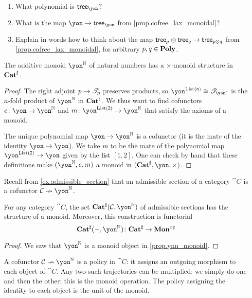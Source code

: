 \documentclass[Book-Poly]{subfiles}
\begin{document}
\begin{exercise}
\begin{enumerate}
	\item What polynomial is $\tr_\yon$?
	\item What is the map $\yon\to\tr_\yon$ from \cref{prop.cofree_lax_monoidal}?
	\item Explain in words how to think about the map $\mathsf{tree}_p\otimes\mathsf{tree}_q\to\mathsf{tree}_{p\otimes q}$ from \cref{prop.cofree_lax_monoidal}, for arbitrary $p,q\in\mathbf{Poly}$.
\qedhere
\end{enumerate}
\end{exercise}

\begin{proposition}\label{prop.ynn_monoid}
The additive monoid $\yon^\nn$ of natural numbers has a $\times$-monoid structure in $\mathbf{Cat}^\sharp$.
\end{proposition}
\begin{proof}
The right adjoint $p\mapsto\mathscr{T}_{p}$ preserves products, so $\yon^{\List(\ord{n})}\cong\cofree{\yon^{\ord{n}}}$ is the $n$-fold product of $\yon^\nn$ in $\mathbf{Cat}^\sharp$. We thus want to find cofunctors $e\colon \yon\to\yon^\nn$ and $m\colon\yon^{\List(\2)}\to\yon^\nn$ that satisfy the axioms of a monoid. 

The unique polynomial map $\yon\to\yon^\nn$ is a cofunctor (it is the mate of the identity $\yon\to\yon$). We take $m$ to be the mate of the polynomial map $\yon^{\List(\2)}\to\yon$ given by the list $[1,2]$. One can check by hand that these definitions make $(\yon^\nn,e,m)$ a monoid in $(\smcat^\sharp,\yon,\times)$.
\end{proof}

Recall from \cref{ex.admissible_section} that an admissible section of a category $\cat{C}$ is a cofunctor $\cat{C}\cof\yon^\nn$.

\begin{corollary}
For any category $\cat{C}$, the set $\smcat^\sharp(\cat{C},\yon^\nn)$ of admissible sections has the structure of a monoid. Moreover, this construction is functorial
\[\smcat^\sharp(-,\yon^\nn)\colon\smcat^\sharp\to\Cat{Mon}\op\]
\end{corollary}
\begin{proof}
We saw that $\yon^\nn$ is a monoid object in \cref{prop.ynn_monoid}.
\end{proof}

A cofunctor $\cat{C}\cof\yon^\nn$ is a policy in $\cat{C}$: it assigns an outgoing morphism to each object of $\cat{C}$. Any two such trajectories can be multiplied: we simply do one and then the other; this is the monoid operation. The policy assigning the identity to each object is the unit of the monoid.
\end{document}
